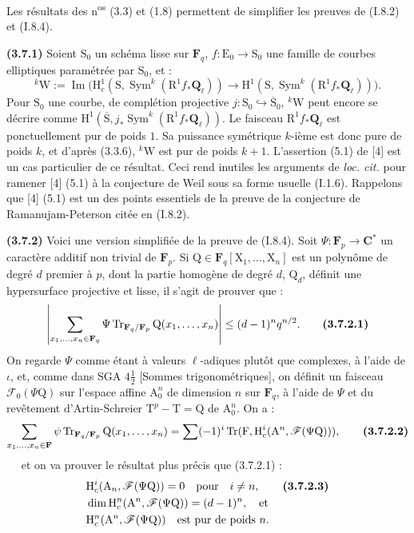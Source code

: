 \documentclass[11pt,leqno]{article}
\newcommand{\Page}[1]{\ifvmode\noindent\else\unskip\ \fi{\footnotesize\textcolor{gray}{[p.\,#1]}}\ \ignorespaces}
\begin{document}
Les résultats des n\textsuperscript{os} (3.3) et (1.8) permettent de simplifier les preuves de (I.8.2) et (I.8.4).

\textbf{(3.7.1)} Soient \(\mathrm S_0\) un schéma lisse sur \(\mathbf F_q\), \(f:\mathrm E_0\to\mathrm S_0\) une famille de courbes elliptiques paramétrée par \(\mathrm S_0\), et :
\[
{}^k\mathrm W:=\operatorname{Im}\bigl(
\mathrm H_c^1(\mathrm S,\operatorname{Sym}^k(\mathrm R^1f_*\mathbf Q_\ell))
\to\mathrm H^1(\mathrm S,\operatorname{Sym}^k(\mathrm R^1f_*\mathbf Q_\ell))
\bigr).
\]
Pour \(\mathrm S_0\) une courbe, de complétion projective \(j:\mathrm S_0\hookrightarrow\overline{\mathrm S}_0\), \({}^k\mathrm W\) peut encore se décrire comme \(\mathrm H^1(\overline{\mathrm S},j_*\operatorname{Sym}^k(\mathrm R^1f_*\mathbf Q_\ell))\). Le faisceau \(\mathrm R^1f_*\mathbf Q_\ell\) est ponctuellement pur de poids \(1\). Sa puissance symétrique \(k\)-ième est donc pure de poids \(k\), et d’après (3.3.6), \({}^k\mathrm W\) est pur de poids \(k+1\). L’assertion (5.1) de [4] est un cas particulier de ce résultat. Ceci rend inutiles les arguments de \textit{loc. cit.} pour ramener [4] (5.1) à la conjecture de Weil sous sa forme usuelle (I.1.6). Rappelons que [4] (5.1) est un des points essentiels de la preuve de la conjecture de Ramanujam-Peterson citée en (I.8.2).

\textbf{(3.7.2)} Voici une version simplifiée de la preuve de (I.8.4). Soit \(\Psi:\mathbf F_p\to\mathbf C^*\) un caractère additif non trivial de \(\mathbf F_p\). Si \(\mathrm Q\in\mathbf F_q[\mathrm X_1,\ldots,\mathrm X_n]\) est un polynôme de degré \(d\) premier à \(p\), dont la partie homogène de degré \(d\), \(\mathrm Q_d\), définit une hypersurface projective et lisse, il s’agit de prouver que :
\[
\left|
\sum_{x_1,\ldots,x_n\in\mathbf F_q}
\Psi\operatorname{Tr}_{\mathbf F_q/\mathbf F_p}\mathrm Q(x_1,\ldots,x_n)
\right|
\leq(d-1)^nq^{n/2}.
\tag*{\textbf{(3.7.2.1)}}
\]
On regarde \(\Psi\) comme étant à valeurs \(\ell\)-adiques plutôt que complexes, à l’aide de \(\iota\), et, comme dans SGA \(4\frac{1}{2}\) [Sommes trigonométriques], on définit un faisceau \(\mathscr F_0(\Psi\mathrm Q)\) sur l’espace affine \(\mathrm A_0^n\) de dimension \(n\) sur \(\mathbf F_q\), à l’aide de \(\Psi\) et du revêtement d’Artin-Schreier \(\mathrm T^p-\mathrm T=\mathrm Q\) de \(\mathrm A_0^n\). On a :
\[
\sum_{x_1,\ldots,x_n\in\mathbf F}
\psi\operatorname{Tr}_{\mathbf F_q/\mathbf F_p}\mathrm Q(x_1,\ldots,x_n)
=
\sum(-1)^i\operatorname{Tr}(\mathrm F,\mathrm H_c^i(\mathrm A^n,\mathscr F(\Psi\mathrm Q))),
\tag*{\textbf{(3.7.2.2)}}
\]
\Page{216}
et on va prouver le résultat plus précis que (3.7.2.1) :
\begin{align*}
&\mathrm H_c^i(\mathrm A_n,\mathscr F(\Psi\mathrm Q))=0
\quad\text{pour}\quad i\ne n,
\tag*{\textbf{(3.7.2.3)}}\\
&\dim\mathrm H_c^n(\mathrm A^n,\mathscr F(\Psi\mathrm Q))=(d-1)^n,
\quad\text{et}\\
&\mathrm H_c^n(\mathrm A^n,\mathscr F(\Psi\mathrm Q))
\quad\text{est pur de poids }n.
\end{align*}
\end{document}
